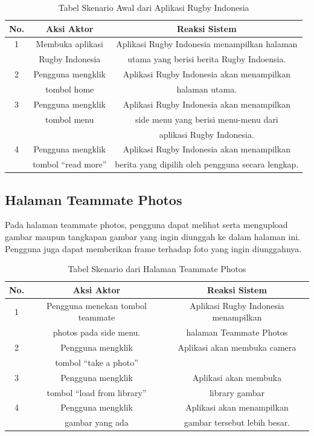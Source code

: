 \begin{table} [!h]
    \centering
    \caption{Tabel Skenario Awal dari Aplikasi Rugby Indonesia}
    \begin{tabular}{|c|c|c|}
    \hline
       No. & Aksi Aktor & Reaksi Sistem  \\ \hline
        1 & Membuka aplikasi & Aplikasi Rugby Indonesia menampilkan halaman \\
         & Rugby Indonesia & utama yang berisi berita Rugby Indoensia. \\ \hline
        2 & Pengguna mengklik & Aplikasi Rugby Indonesia akan menampilkan \\ 
         & tombol home &  halaman utama. \\ \hline
        3 & Pengguna mengklik & Aplikasi Rugby Indonesia akan menampilkan \\ 
         & tombol menu &  side menu yang berisi menu-menu dari \\ 
         & &  aplikasi Rugby Indonesia. \\ \hline
        4 & Pengguna mengklik & Aplikasi Rugby Indonesia akan menampilkan \\
          & tombol ``read more'' & berita yang dipilih oleh pengguna secara lengkap. \\ \hline
    \end{tabular}
    \label{tab:existing-scenario-welcome-page}
\end{table}

\subsection{Halaman Teammate Photos}

Pada halaman teammate photos, pengguna dapat melihat serta mengupload gambar maupun tangkapan gambar yang ingin diunggah ke dalam halaman ini. Pengguna juga dapat memberikan frame terhadap foto yang ingin diunggahnya.

\begin{table} [!h]
    \centering
    \caption{Tabel Skenario dari Halaman Teammate Photos}
    \begin{tabular}{|c|c|c|}
    \hline
       No. & Aksi Aktor & Reaksi Sistem  \\ \hline
        1 & Pengguna menekan tombol teammate & Aplikasi Rugby Indonesia menampilkan \\
         &  photos pada side menu. & halaman Teammate Photos \\ \hline
        2 & Pengguna mengklik & Aplikasi akan membuka camera \\ 
         & tombol ``take a photo'' &  \\ \hline
        3 & Pengguna mengklik & Aplikasi akan membuka  \\ 
         & tombol ``load from library'' & library gambar  \\ \hline
        4 & Pengguna mengklik & Aplikasi akan menampilkan \\
          & gambar yang ada & gambar tersebut lebih besar. \\ \hline
    \end{tabular}
    \label{tab:existing-scenario-teammate-photos-page}
\end{table}


